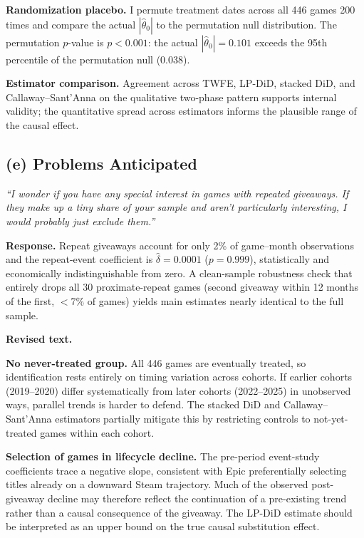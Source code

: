 \documentclass[11pt]{article}
\begin{document}
\textbf{Randomization placebo.} I permute treatment dates across all 446
games 200 times and compare the actual $|\hat{\theta}_0|$ to the permutation
null distribution. The permutation $p$-value is $p < 0.001$: the actual
$|\hat{\theta}_0| = 0.101$ exceeds the 95th percentile of the permutation null
(0.038).

\textbf{Estimator comparison.} Agreement across TWFE, LP-DiD, stacked DiD,
and Callaway--Sant'Anna on the qualitative two-phase pattern supports internal
validity; the quantitative spread across estimators informs the plausible
range of the causal effect.

\subsection{(e) Problems Anticipated}

\begin{feedbackbox}
\small\textit{``I wonder if you have any special interest in games with
repeated giveaways. If they make up a tiny share of your sample and aren't
particularly interesting, I would probably just exclude them.''}
\end{feedbackbox}

\textbf{Response.}
Repeat giveaways account for only 2\% of game--month
observations and the repeat-event coefficient is $\hat{\delta} = 0.0001$
($p = 0.999$), statistically and economically indistinguishable from zero.
A clean-sample robustness check that entirely drops all 30 proximate-repeat
games (second giveaway within 12 months of the first, $<$7\% of games)
yields main estimates nearly identical to the full sample.

\textbf{Revised text.}

\textbf{No never-treated group.} All 446 games are eventually treated, so
identification rests entirely on timing variation across cohorts. If earlier
cohorts (2019--2020) differ systematically from later cohorts (2022--2025)
in unobserved ways, parallel trends is harder to defend. The stacked DiD and
Callaway--Sant'Anna estimators partially mitigate this by restricting controls
to not-yet-treated games within each cohort.

\textbf{Selection of games in lifecycle decline.} The pre-period event-study
coefficients trace a negative slope, consistent with Epic preferentially
selecting titles already on a downward Steam trajectory. Much of the observed
post-giveaway decline may therefore reflect the continuation of a pre-existing
trend rather than a causal consequence of the giveaway. The LP-DiD estimate
should be interpreted as an upper bound on the true causal substitution effect.
\end{document}
